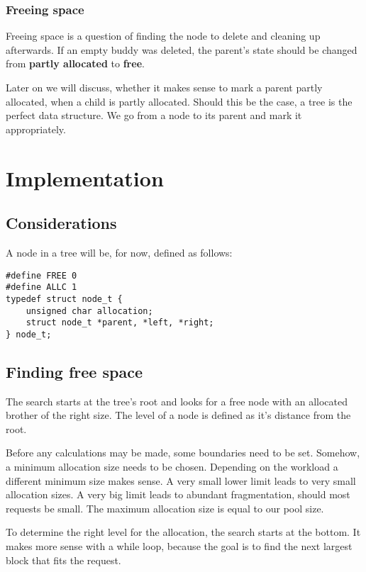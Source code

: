 \documentclass[runningheads]{llncs}
\begin{document}
\subsubsection{Freeing space}
Freeing space is a question of finding the node to delete and cleaning up
afterwards. If an empty buddy was deleted, the parent's state should be changed
from \textbf{partly allocated} to \textbf{free}.

Later on we will discuss, whether it makes sense to mark a parent partly
allocated, when a child is partly allocated. Should this be the case, a 
tree is the perfect data structure. We go from a node to its parent and 
mark it appropriately.

\section{Implementation}

\subsection{Considerations}

A node in a tree will be, for now, defined as follows:

\begin{verbatim}
#define FREE 0
#define ALLC 1
typedef struct node_t {
    unsigned char allocation;
    struct node_t *parent, *left, *right;
} node_t;
\end{verbatim}

\subsection{Finding free space}

The search starts at the tree's root and looks for a free node with an allocated
brother of the right size. The level of a node is defined as it's distance from 
the root.

Before any calculations may be made, some boundaries need to be set.
Somehow, a minimum allocation size needs to be chosen. Depending on the
workload a different minimum size makes sense. A very small lower limit
leads to very small allocation sizes. A very big limit leads to abundant
fragmentation, should most requests be small. The maximum allocation size
is equal to our pool size.

To determine the right level for the allocation, the search starts at the
bottom. It makes more sense with a while loop, because the goal is to 
find the next largest block that fits the request.
\end{document}
